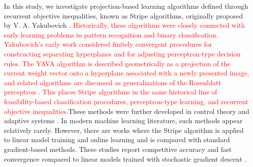 \documentclass[a4paper,fleqn]{cas-sc}
\begin{document}

In this study, we investigate projection-based learning algorithms defined through recurrent objective inequalities, known as Stripe algorithms, originally proposed by V. A. Yakubovich \cite{Yakubovich1965,Yakubovich1966Recurrent}. 
\textcolor{red}{Historically, these algorithms were closely connected with early learning problems in pattern recognition and binary classification. Yakubovich's early work considered finitely convergent procedures for constructing separating hyperplanes and for adjusting perceptron-type decision rules. The YAVA algorithm is described geometrically as a projection of the current weight vector onto a hyperplane associated with a newly presented image, and related algorithms are discussed as generalizations of the Rosenblatt perceptron \cite{Yakubovich1966Recurrent,FradkovShepel2022}. This places Stripe algorithms in the same historical line of feasibility-based classification procedures, perceptron-type learning, and recurrent objective inequalities.}These methods were further developed in control theory and adaptive systems \cite{Fomin1976,Fomin1981}.
In modern machine learning literature, such methods appear relatively rarely. However, there are works where the Stripe algorithm is applied to linear model training and online learning and is compared with standard gradient-based methods. These studies report competitive accuracy and fast convergence compared to linear models trained with stochastic gradient descent \cite{LIPKOVICH2022138,Lipkovich2023StripeEEG}.
\end{document}
